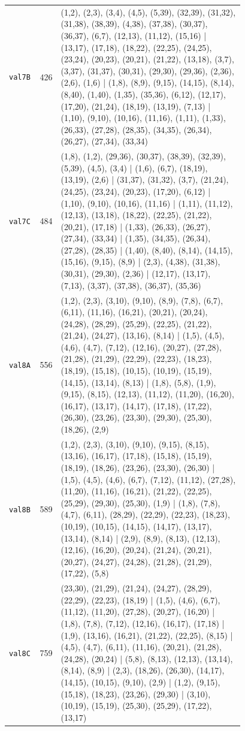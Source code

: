 \begin{landscape}
\begin{longtable}{lr>{\tiny\raggedright\arraybackslash}p{0.78\linewidth}}
\texttt{val7B} & 426 & (1,2), (2,3), (3,4), (4,5), (5,39), (32,39), (31,32), (31,38), (38,39), (4,38), (37,38), (30,37), (36,37), (6,7), (12,13), (11,12), (15,16) | (13,17), (17,18), (18,22), (22,25), (24,25), (23,24), (20,23), (20,21), (21,22), (13,18), (3,7), (3,37), (31,37), (30,31), (29,30), (29,36), (2,36), (2,6), (1,6) | (1,8), (8,9), (9,15), (14,15), (8,14), (8,40), (1,40), (1,35), (35,36), (6,12), (12,17), (17,20), (21,24), (18,19), (13,19), (7,13) | (1,10), (9,10), (10,16), (11,16), (1,11), (1,33), (26,33), (27,28), (28,35), (34,35), (26,34), (26,27), (27,34), (33,34) \\[2pt]
\texttt{val7C} & 484 & (1,8), (1,2), (29,36), (30,37), (38,39), (32,39), (5,39), (4,5), (3,4) | (1,6), (6,7), (18,19), (13,19), (2,6) | (31,37), (31,32), (3,7), (21,24), (24,25), (23,24), (20,23), (17,20), (6,12) | (1,10), (9,10), (10,16), (11,16) | (1,11), (11,12), (12,13), (13,18), (18,22), (22,25), (21,22), (20,21), (17,18) | (1,33), (26,33), (26,27), (27,34), (33,34) | (1,35), (34,35), (26,34), (27,28), (28,35) | (1,40), (8,40), (8,14), (14,15), (15,16), (9,15), (8,9) | (2,3), (4,38), (31,38), (30,31), (29,30), (2,36) | (12,17), (13,17), (7,13), (3,37), (37,38), (36,37), (35,36) \\[2pt]
\texttt{val8A} & 556 & (1,2), (2,3), (3,10), (9,10), (8,9), (7,8), (6,7), (6,11), (11,16), (16,21), (20,21), (20,24), (24,28), (28,29), (25,29), (22,25), (21,22), (21,24), (24,27), (13,16), (8,14) | (1,5), (4,5), (4,6), (4,7), (7,12), (12,16), (20,27), (27,28), (21,28), (21,29), (22,29), (22,23), (18,23), (18,19), (15,18), (10,15), (10,19), (15,19), (14,15), (13,14), (8,13) | (1,8), (5,8), (1,9), (9,15), (8,15), (12,13), (11,12), (11,20), (16,20), (16,17), (13,17), (14,17), (17,18), (17,22), (26,30), (23,26), (23,30), (29,30), (25,30), (18,26), (2,9) \\[2pt]
\texttt{val8B} & 589 & (1,2), (2,3), (3,10), (9,10), (9,15), (8,15), (13,16), (16,17), (17,18), (15,18), (15,19), (18,19), (18,26), (23,26), (23,30), (26,30) | (1,5), (4,5), (4,6), (6,7), (7,12), (11,12), (27,28), (11,20), (11,16), (16,21), (21,22), (22,25), (25,29), (29,30), (25,30), (1,9) | (1,8), (7,8), (4,7), (6,11), (28,29), (22,29), (22,23), (18,23), (10,19), (10,15), (14,15), (14,17), (13,17), (13,14), (8,14) | (2,9), (8,9), (8,13), (12,13), (12,16), (16,20), (20,24), (21,24), (20,21), (20,27), (24,27), (24,28), (21,28), (21,29), (17,22), (5,8) \\[2pt]
\texttt{val8C} & 759 & (23,30), (21,29), (21,24), (24,27), (28,29), (22,29), (22,23), (18,19) | (1,5), (4,6), (6,7), (11,12), (11,20), (27,28), (20,27), (16,20) | (1,8), (7,8), (7,12), (12,16), (16,17), (17,18) | (1,9), (13,16), (16,21), (21,22), (22,25), (8,15) | (4,5), (4,7), (6,11), (11,16), (20,21), (21,28), (24,28), (20,24) | (5,8), (8,13), (12,13), (13,14), (8,14), (8,9) | (2,3), (18,26), (26,30), (14,17), (14,15), (10,15), (9,10), (2,9) | (1,2), (9,15), (15,18), (18,23), (23,26), (29,30) | (3,10), (10,19), (15,19), (25,30), (25,29), (17,22), (13,17) \\[2pt]

\end{longtable}
\end{landscape}
